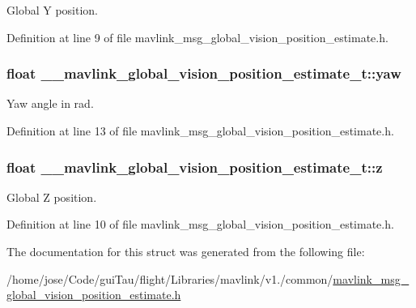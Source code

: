 Global Y position. 



Definition at line 9 of file mavlink\-\_\-msg\-\_\-global\-\_\-vision\-\_\-position\-\_\-estimate.\-h.

\hypertarget{struct____mavlink__global__vision__position__estimate__t_adcbed99801fc5b5e77817e56c9e74cce}{
\subsubsection[{yaw}]{\setlength{\rightskip}{0pt plus 5cm}float \-\_\-\-\_\-mavlink\-\_\-global\-\_\-vision\-\_\-position\-\_\-estimate\-\_\-t\-::yaw}}\label{struct____mavlink__global__vision__position__estimate__t_adcbed99801fc5b5e77817e56c9e74cce}


Yaw angle in rad. 



Definition at line 13 of file mavlink\-\_\-msg\-\_\-global\-\_\-vision\-\_\-position\-\_\-estimate.\-h.

\hypertarget{struct____mavlink__global__vision__position__estimate__t_ab7cb6c5e88d406ac8566580d0c4003ee}{
\subsubsection[{z}]{\setlength{\rightskip}{0pt plus 5cm}float \-\_\-\-\_\-mavlink\-\_\-global\-\_\-vision\-\_\-position\-\_\-estimate\-\_\-t\-::z}}\label{struct____mavlink__global__vision__position__estimate__t_ab7cb6c5e88d406ac8566580d0c4003ee}


Global Z position. 



Definition at line 10 of file mavlink\-\_\-msg\-\_\-global\-\_\-vision\-\_\-position\-\_\-estimate.\-h.



The documentation for this struct was generated from the following file\-:\begin{DoxyCompactItemize}
\item 
/home/jose/\-Code/gui\-Tau/flight/\-Libraries/mavlink/v1./common/\hyperlink{mavlink__msg__global__vision__position__estimate_8h}{mavlink\-\_\-msg\-\_\-global\-\_\-vision\-\_\-position\-\_\-estimate.\-h}\end{DoxyCompactItemize}
